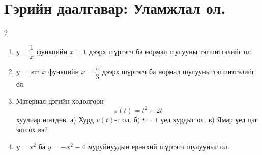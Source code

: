 \section{Гэрийн даалгавар: Уламжлал ол.}
\begin{multicols}{2}
\begin{enumerate}
  \item $y=\dfrac{1}{x}$ функцийн $x=1$ дээрх шүргэгч ба нормал  шулууны тэгшитгэлийг ол.
  \item $y=\sin x$ функцийн $x=\dfrac{\pi}{3}$ дээрх шүргэгч ба нормал шулууны тэгшитгэлийг ол.
  \item Материал цэгийн хөдөлгөөн
\[
s(t)=t^2+2t
\]
хуулиар өгөгдөв.  
а) Хурд $v(t)$-г ол.  
б) $t=1$ үед хурдыг ол.  
в) Ямар үед цэг зогсох вэ?
\item $y=x^2$ ба $y=-x^2-4$ муруйнуудын ерөнхий шүргэгч шулууныг ол.


\end{enumerate}
\end{multicols}
